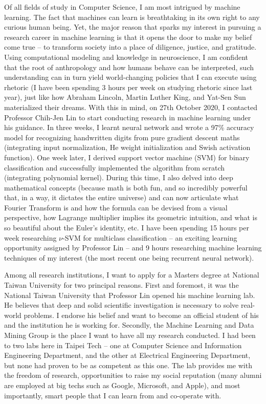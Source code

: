 \documentclass[letterpaper,12pt]{article}
\begin{document}
Of all fields of study in Computer Science, I am most intrigued by machine learning. The fact that machines can learn is breathtaking in its own right to any curious human being. Yet, the major reason that sparks my interest in pursuing a research career in machine learning is that it opens the door to make my belief come true -- to transform society into a place of diligence, justice, and gratitude. Using computational modeling and knowledge in neuroscience, I am confident that the root of anthropology and how humans behave can be interpreted, such understanding can in turn yield world-changing policies that I can execute using rhetoric (I have been spending 3 hours per week on studying rhetoric since last year), just like how Abraham Lincoln, Martin Luther King, and Yat-Sen Sun materialized their dreams. With this in mind, on 27th October 2020, I contacted Professor Chih-Jen Lin to start conducting research in machine learning under his guidance. In three weeks, I learnt neural network and wrote a 97\% accuracy model for recognizing handwritten digits from pure gradient descent maths (integrating input normalization, He weight initialization and Swish activation function). One week later, I derived support vector machine (SVM) for binary classification and successfully implemented the algorithm from scratch (integrating polynomial kernel). During this time, I also delved into deep mathematical concepts (because math is both fun, and so incredibly powerful that, in a way, it dictates the entire universe) and can now articulate what Fourier Transform is and how the formula can be devised from a visual perspective, how Lagrange multiplier implies its geometric intuition, and what is so beautiful about the Euler's identity, etc. I have been spending 15 hours per week researching \(\nu\)-SVM for multiclass classification -- an exciting learning opportunity assigned by Professor Lin -- and 9 hours researching machine learning techniques of my interest (the most recent one being recurrent neural network).

Among all research institutions, I want to apply for a Masters degree at National Taiwan University for two principal reasons. First and foremost, it was the National Taiwan University that Professor Lin opened his machine learning lab. He believes that deep and solid scientific investigation is necessary to solve real-world problems. I endorse his belief and want to become an official student of his and the institution he is working for. Secondly, the Machine Learning and Data Mining Group is the place I want to have all my research conducted. I had been to two labs here in Taipei Tech -- one at Computer Science and Information Engineering Department, and the other at Electrical Engineering Department, but none had proven to be as competent as this one. The lab provides me with the freedom of research, opportunities to raise my social reputation (many alumni are employed at big techs such as Google, Microsoft, and Apple), and most importantly, smart people that I can learn from and co-operate with.
\end{document}
